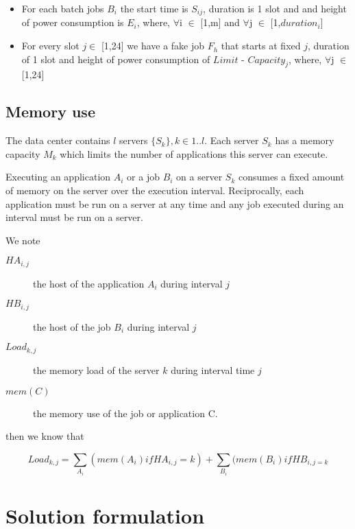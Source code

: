 \documentclass[a4paper]{article}
\begin{document}
\begin{itemize}
\item For each batch jobs $B_{i}$ the start time is $S_{ij}$, duration is 1 slot and and height of power consumption is $E_{i}$, where, $\forall$i $\in$ [1,m] and $\forall$j $\in$ [1,$duration_i$]
\end{itemize}

\begin{itemize}
\item  For every slot ${j}\in$ [1,24] we have a fake job $F_{h}$ that starts at fixed $j$, duration of 1 slot and height of power consumption of $Limit$ - $Capacity_j$, where, $\forall$j $\in$ [1,24]
\end{itemize}


\subsection{Memory use}

The data center contains $l$ servers $\{S_k\}, k\in 1..l$. Each server $S_k$ has a memory capacity $M_k$ which limits the number of applications this server can execute.

Executing an application $A_i$ or a job $B_i$ on a server $S_k$ consumes a fixed amount of memory 
on the server over the execution interval. Reciprocally, each application must be run on a server at any time and any job executed during an interval must be run on a server.

We note
\begin{description}
\item[$HA_{i,j}$] the host of the application $A_i$ during interval $j$
\item[$HB_{i,j}$] the host of the job $B_i$ during interval $j$
\item[$Load_{k,j}$] the memory load of the server $k$ during interval time $j$
\item[$mem(C)$] the memory use of the job or application C.
\end{description}

then we know that

\begin{equation}
Load_{k,j} = \sum_{A_i}(mem(A_i) if HA_{i,j}=k) + \sum_{B_i}(mem(B_i) if HB_{i,j=k}
\end{equation}


\section{Solution formulation}
\end{document}
